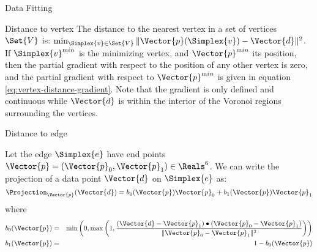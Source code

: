 \begin{plSection}{Data Fitting}
\begin{plSection}{Distance to vertex}
The distance to the nearest vertex in a set of vertices $\Set{V}$ is:
$\min_{\Simplex{v} \in \Set{V}} \| \Vector{p}(\Simplex{v}) - \Vector{d} \|^2$.
If $\Simplex{v}^{\mathrm min}$ is the minimizing vertex,
and
$\Vector{p}^{\mathrm min}$ its position,
then the partial gradient with respect
to the position of any other vertex is zero,
and the partial gradient with respect to $\Vector{p}^{\mathrm min}$
is given in equation \ref{eq:vertex-distance-gradient}.
Note that the gradient is only defined and continuous
while $\Vector{d}$ is within the interior of the
Voronoi regions surrounding the vertices.

\end{plSection}%
\begin{plSection}{Distance to edge}
\label{sec:Distance-to-edge}

Let the edge $\Simplex{e}$ have end points $\Vector{p} = (\Vector{p}_0, \Vector{p}_1) \in \Reals^6$.
We can write the projection of a data point $\Vector{d}$ on $\Simplex{e}$ as:
\begin{equation}
\Projection_\Vector{p} (\Vector{d}) = b_0(\Vector{p}) \Vector{p}_0 + b_1(\Vector{p}) \Vector{p}_1
\end{equation}
where
\begin{eqnarray}
b_0(\Vector{p}) & = &
\min\left(0,\max\left(1,
{{ (\Vector{d} - \Vector{p}_1) \bullet (\Vector{p}_0 - \Vector{p}_1) }
\over
{ \| \Vector{p}_0 - \Vector{p}_1 \|^2 }
}\right) \right) \\
b_1(\Vector{p}) & = & 1 - b_0(\Vector{p})
\nonumber
\end{eqnarray}


\end{plSection}
\end{plSection}
